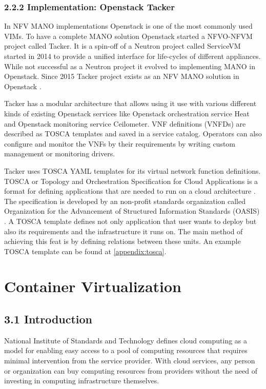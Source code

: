 \documentclass[12pt,oneandhalf,chaparabic,ceng,ms,eng,oneside,pntc]{gsufbe}
\begin{document}
\subsection[Implementation: Openstack Tacker]{2.2.2 Implementation: Openstack Tacker}
In NFV MANO implementations Openstack \cite{openstack} is one of the most commonly used VIMs.  To have
a complete MANO
solution Openstack started a NFVO-NFVM project called Tacker.  It is a spin-off of a Neutron project
called ServiceVM started in 2014 to provide a unified interface for life-cycles of different
appliances.  While not successful as a Neutron project it evolved to implementing MANO in Openstack.
Since 2015 Tacker project exists as an NFV MANO solution in Openstack \cite{tacker}.

Tacker has a modular architecture that allows using it use with various different kinds of
existing Openstack services like Openstack orchestration service Heat and Openstack monitoring service
Ceilometer.  VNF definitions (VNFDs) are described as TOSCA templates and saved in a service catalog.
Operators can also configure and monitor the VNFs by their requirements by writing custom management or
monitoring drivers.

Tacker uses TOSCA YAML templates for its virtual network function definitions.  TOSCA or Topology and
Orchestration Specification for Cloud Applications is a format for defining applications that are needed
to run on a cloud architecture \cite{oasis_tosca}.  The specification is developed by an non-profit
standards organization
called Organization for the Advancement of Structured Information Standards (OASIS) \cite{oasis}.
A TOSCA template defines not only application that user wants to deploy but also
its requirements and the infrastructure it runs on.  The main method of achieving
this feat is by defining relations between these units.  An example TOSCA template can be found at
\ref{appendix:tosca}.


\chapter{Container Virtualization}
\section[Introduction]{3.1 Introduction}
National Institute of Standards and Technology defines cloud computing as a model for enabling
easy access to a pool of computing resources that requires minimal intervention from the service
provider.  With cloud services, any person or organization can buy computing resources from providers
without the need of investing in computing infrastructure themselves.  
\end{document}
